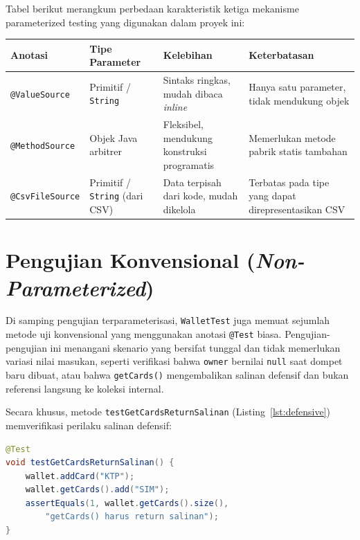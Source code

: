 \documentclass[12pt,a4paper]{article}
\begin{document}
Tabel berikut merangkum perbedaan karakteristik ketiga mekanisme parameterized testing
yang digunakan dalam proyek ini:

\begin{longtable}{>{\raggedright\arraybackslash}p{3cm}
                  >{\raggedright\arraybackslash}p{3cm}
                  >{\raggedright\arraybackslash}p{4cm}
                  >{\raggedright\arraybackslash}p{4cm}}
\toprule
\textbf{Anotasi} & \textbf{Tipe Parameter} & \textbf{Kelebihan} & \textbf{Keterbatasan} \\
\midrule
\endhead
\texttt{@ValueSource}    & Primitif / \texttt{String}  &
  Sintaks ringkas, mudah dibaca \textit{inline} &
  Hanya satu parameter, tidak mendukung objek \\[4pt]
\texttt{@MethodSource}   & Objek Java arbitrer &
  Fleksibel, mendukung konstruksi programatis &
  Memerlukan metode pabrik statis tambahan \\[4pt]
\texttt{@CsvFileSource}  & Primitif / \texttt{String} (dari CSV) &
  Data terpisah dari kode, mudah dikelola &
  Terbatas pada tipe yang dapat direpresentasikan CSV \\
\bottomrule
\end{longtable}

\section{Pengujian Konvensional (\textit{Non-Parameterized})}

Di samping pengujian terparameterisasi, \texttt{WalletTest} juga memuat sejumlah metode
uji konvensional yang menggunakan anotasi \texttt{@Test} biasa.  Pengujian-pengujian ini
menangani skenario yang bersifat tunggal dan tidak memerlukan variasi nilai masukan,
seperti verifikasi bahwa \texttt{owner} bernilai \texttt{null} saat dompet baru dibuat,
atau bahwa \texttt{getCards()} mengembalikan salinan defensif dan bukan referensi langsung
ke koleksi internal.

Secara khusus, metode \texttt{testGetCardsReturnSalinan} (Listing~\ref{lst:defensive})
memverifikasi perilaku salinan defensif:

\begin{lstlisting}[language=Java,
                   caption={Verifikasi salinan defensif pada \texttt{getCards()}},
                   label={lst:defensive}]
@Test
void testGetCardsReturnSalinan() {
    wallet.addCard("KTP");
    wallet.getCards().add("SIM");
    assertEquals(1, wallet.getCards().size(),
        "getCards() harus return salinan");
}
\end{lstlisting}
\end{document}
